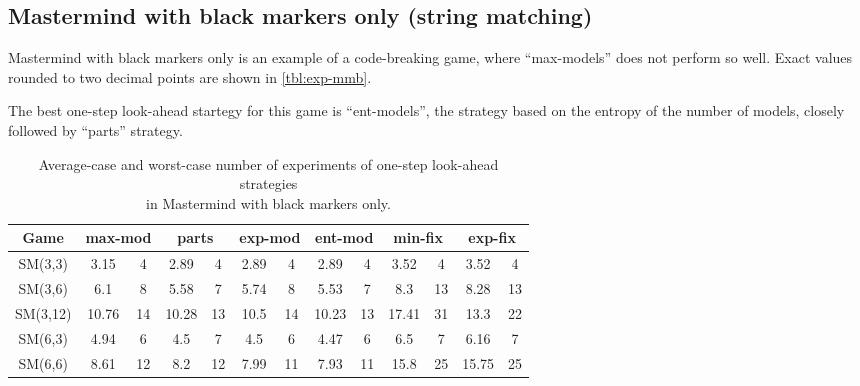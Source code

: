 \subsection{Mastermind with black markers only (string matching)}

Mastermind with black markers only is an example of a code-breaking game,
  where ``max-models'' does not perform so well.
Exact values rounded to two decimal points are shown in \autoref{tbl:exp-mmb}.

The best one-step look-ahead startegy for this game is ``ent-models'',
  the strategy based on the entropy of the number of models,
  closely followed by ``parts'' strategy.

\begin{table}[f]
\begin{center}
\begin{small}
\begin{tabular}{|c|c|c|c|c|c|c|c|c|c|c|c|c|}\hline
Game & \multicolumn{2}{c|}{max-mod} & \multicolumn{2}{c|}{parts}
& \multicolumn{2}{c|}{exp-mod} & \multicolumn{2}{c|}{ent-mod}
& \multicolumn{2}{c|}{min-fix} & \multicolumn{2}{c|}{exp-fix}\\ \hline
SM(3,3) & 3.15 &  4 &  2.89 & 4 & 2.89 & 4 & 2.89 & 4 & 3.52 &  4 & 3.52 &  4 \\
SM(3,6) & 6.1 &  8 &  5.58 & 7 & 5.74 & 8 & 5.53 & 7 & 8.3 & 13 &  8.28 &  13 \\
SM(3,12)& 10.76& 14 & 10.28 & 13& 10.5 & 14 & 10.23 & 13 &  17.41 & 31 &  13.3 &  22 \\ \hline
SM(6,3)& 4.94 &  6 &  4.5 & 7 & 4.5 & 6 & 4.47 &  6 & 6.5 & 7 & 6.16 &  7 \\
SM(6,6)& 8.61 & 12 &  8.2 & 12& 7.99 & 11 & 7.93 & 11 &  15.8 &  25 &  15.75 & 25 \\ \hline
\end{tabular}
\end{small}
\caption{Average-case and worst-case number of experiments
  of one-step look-ahead strategies \\ in Mastermind with black markers only.}
\label{tbl:exp-mmb}
\end{center}
\end{table}

